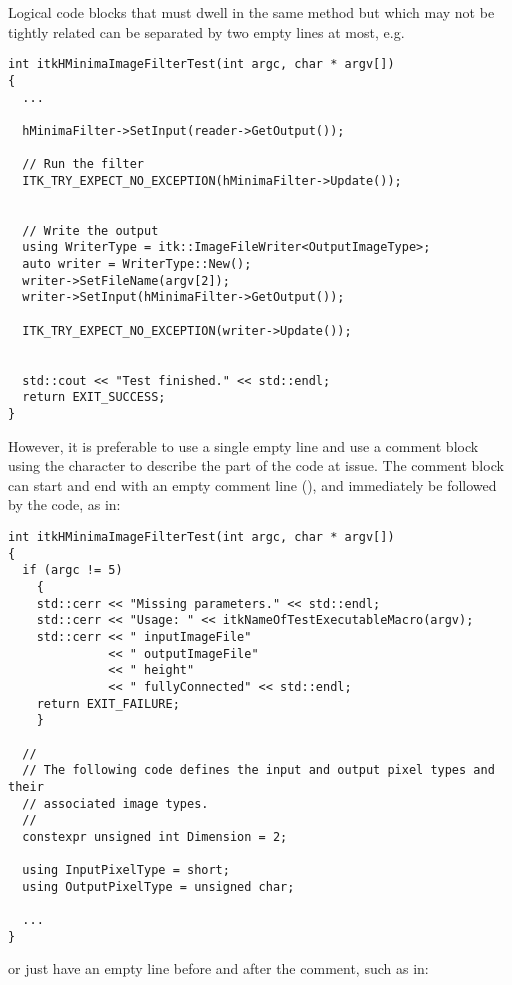 Logical code blocks that must dwell in the same method but which may not be
tightly related can be separated by two empty lines at most, e.g.

\small
\begin{verbatim}
int itkHMinimaImageFilterTest(int argc, char * argv[])
{
  ...

  hMinimaFilter->SetInput(reader->GetOutput());

  // Run the filter
  ITK_TRY_EXPECT_NO_EXCEPTION(hMinimaFilter->Update());


  // Write the output
  using WriterType = itk::ImageFileWriter<OutputImageType>;
  auto writer = WriterType::New();
  writer->SetFileName(argv[2]);
  writer->SetInput(hMinimaFilter->GetOutput());

  ITK_TRY_EXPECT_NO_EXCEPTION(writer->Update());


  std::cout << "Test finished." << std::endl;
  return EXIT_SUCCESS;
}
\end{verbatim}
\normalsize


However, it is preferable to use a single empty line and use a comment block
using the \code{//} character to describe the part of the code at issue. The
comment block can start and end with an empty comment line (\code{//}), and
immediately be followed by the code, as in:

\small
\begin{verbatim}
int itkHMinimaImageFilterTest(int argc, char * argv[])
{
  if (argc != 5)
    {
    std::cerr << "Missing parameters." << std::endl;
    std::cerr << "Usage: " << itkNameOfTestExecutableMacro(argv);
    std::cerr << " inputImageFile"
              << " outputImageFile"
              << " height"
              << " fullyConnected" << std::endl;
    return EXIT_FAILURE;
    }

  //
  // The following code defines the input and output pixel types and their
  // associated image types.
  //
  constexpr unsigned int Dimension = 2;

  using InputPixelType = short;
  using OutputPixelType = unsigned char;

  ...
}
\end{verbatim}
\normalsize

or just have an empty line before and after the comment, such as in:

